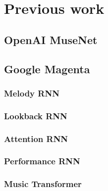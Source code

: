 \documentclass[../../report.tex]{subfiles}
\begin{document}
\section{Previous work}

\subsection{OpenAI MuseNet}
\subsection{Google Magenta}
\subsubsection{Melody RNN}
\subsubsection{Lookback RNN}
\subsubsection{Attention RNN}
\subsubsection{Performance RNN}
\subsubsection{Music Transformer}
\end{document}
